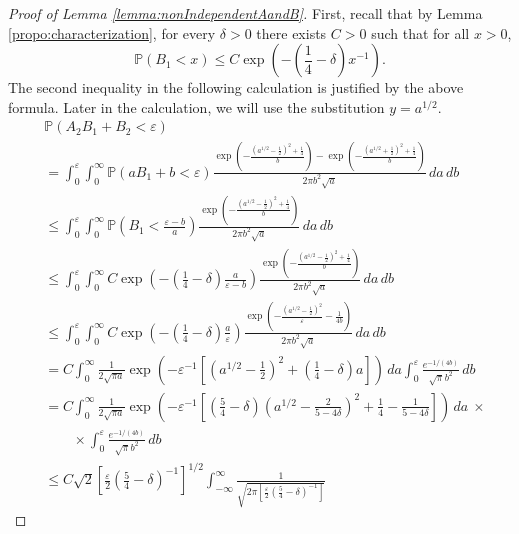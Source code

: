\documentclass[bj]{imsart}
\numberwithin{equation}{section}
\renewcommand{\P}{\mathbb{P}}
\newcommand{\1}{\mathbf{1}}
\theoremstyle{definition}
\begin{document}
\begin{proof}[Proof of Lemma \ref{lemma:nonIndependentAandB}]
First, recall that by Lemma \ref{propo:characterization}, for every $\delta>0$ there exists $C>0$ such that for all $x>0$,
\begin{equation*}
 \P(B_1<x)\leq C\exp\left(-\left(\frac{1}{4}-\delta\right)x^{-1}\right). %
\end{equation*}
The second inequality in the following calculation is justified by the above formula. Later in the calculation, we will use the substitution $y=a^{1/2}$.
\begin{align*}
 & \P(A_2B_1+B_2<\varepsilon)\\
&= \int_0^{\varepsilon}\int_0^{\infty}\P(aB_1+b<\varepsilon)
\frac{\exp\left(-\frac{\left(a^{1/2}-\frac{1}{2}\right)^2+\frac{1}{4}}{b}\right)-\exp\left(-\frac{\left(a^{1/2}+\frac{1}{2}\right)^2+\frac{1}{4}}{b}\right)}{2\pi b^2\sqrt{ a}} \, da\, db\\
&\leq \int_0^{\varepsilon}\int_0^{\infty}\P\left(B_1<\frac{\varepsilon-b}{a}\right)\frac{\exp\left(-\frac{\left(a^{1/2}-\frac{1}{2}\right)^2+\frac{1}{4}}{b}\right)}{2\pi b^2\sqrt{ a}} \, da\, db\\
&\leq \int_0^{\varepsilon}\int_0^{\infty}
C\exp\left(-\left(\frac{1}{4}-\delta\right)\frac{a}{\varepsilon-b}\right)\frac{\exp\left(-\frac{\left(a^{1/2}-\frac{1}{2}\right)^2+\frac{1}{4}}{b}\right)}{2\pi b^2\sqrt{ a}} \, da\, db\\
&\leq \int_0^{\varepsilon}\int_0^{\infty}
C\exp\left(-\left(\frac{1}{4}-\delta\right)\frac{a}{\varepsilon}\right)\frac{\exp\left(-\frac{\left(a^{1/2}-\frac{1}{2}\right)^2}{\varepsilon}-\frac{1}{4b}\right)}{2\pi b^2\sqrt{ a}} \, da\, db\\
&= C\int_0^{\infty}\frac{1}{2\sqrt{\pi  a}}\exp\left(-\varepsilon^{-1}\left[\left(a^{1/2}-\frac{1}{2}\right)^2+\left(\frac{1}{4}-\delta\right)a\right]\right) \, da\int_0^{\varepsilon}\frac{e^{-1/(4b)}}{\sqrt{\pi} b^2}\, db\\
&= C\int_0^{\infty}\frac{1}{2\sqrt{\pi  a}}\exp\left(-\varepsilon^{-1}\left[\left(\frac{5}{4}-\delta\right)\left(a^{1/2}-\frac{2}{5-4\delta}\right)^2+\frac{1}{4}-\frac{1}{5-4\delta}\right]\right) \, da\ \times\\
&\qquad \times\int_0^{\varepsilon}\frac{e^{-1/(4b)}}{\sqrt{\pi} b^2}\, db\\
&\leq C\sqrt{2}\left[\frac{\varepsilon}{2}\left(\frac{5}{4}-\delta\right)^{-1}\right]^{1/2}\int_{-\infty}^{\infty}\frac{1}{\sqrt{2\pi \left[\frac{\varepsilon}{2}\left(\frac{5}{4}-\delta\right)^{-1}\right]}}

\end{align*}
\end{proof}
\end{document}
